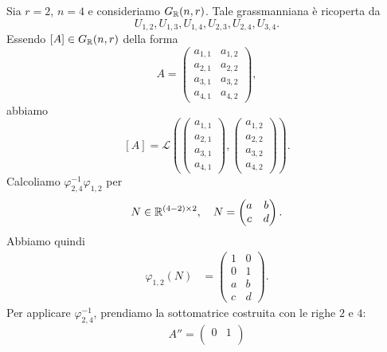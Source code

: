 \documentclass[a4paper]{article}
\begin{document}
\begin{snippetexample}{}
    Sia \(r = 2\), \(n=4\) e consideriamo \(G_{\mathbb{R}}(n, r)\).
    Tale grassmanniana è ricoperta da
    \[
        U_{1,2},
        U_{1,3},
        U_{1,4},
        U_{2,3},
        U_{2,4},
        U_{3,4}.
    \]
    Essendo \([A] \in G_{\mathbb{R}}(n,r)\) della forma
    \[
        A = \begin{pmatrix}
            a_{1,1} & a_{1,2} \\
            a_{2,1} & a_{2,2} \\
            a_{3,1} & a_{3,2} \\
            a_{4,1} & a_{4,2}
        \end{pmatrix},
    \]
    abbiamo
    \[
        [A] = \mathcal L\left(
            \begin{pmatrix}
                a_{1,1} \\
                a_{2,1} \\
                a_{3,1} \\
                a_{4,1}
            \end{pmatrix},
            \begin{pmatrix}
                a_{1,2} \\
                a_{2,2} \\
                a_{3,2} \\
                a_{4,2}
            \end{pmatrix}
        \right).
    \]
    Calcoliamo \(\varphi_{2,4}^{-1}\varphi_{1,2}\)
    per
    \[
        N \in \mathbb{R}^{(4-2) \times 2}, \quad
        N = \begin{pmatrix}
            a & b \\ c & d
        \end{pmatrix}.
    \]
    Abbiamo quindi
    \begin{align*}
        \varphi_{1,2}(N)
        &=
        \begin{pmatrix}
            1 & 0 \\
            0 & 1 \\
            a & b \\
            c & d
        \end{pmatrix}.
    \end{align*}
    Per applicare \(\varphi_{2,4}^{-1}\), prendiamo la sottomatrice
    costruita con le righe \(2\) e \(4\):
    \[
        A'' =
        \begin{pmatrix}
            0 & 1 \\

\end{pmatrix}\]
\end{snippetexample}
\end{document}
